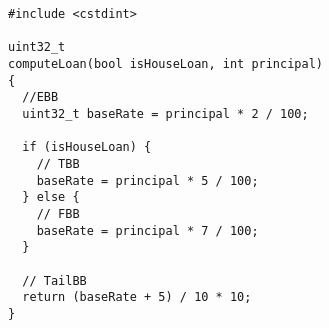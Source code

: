 \begin{minipage}{0.50\textwidth}
    \begin{lstlisting}[style=CStyle, basicstyle=\tiny\ttfamily]
#include <cstdint>

uint32_t 
computeLoan(bool isHouseLoan, int principal) 
{
  //EBB
  uint32_t baseRate = principal * 2 / 100;

  if (isHouseLoan) {
    // TBB
    baseRate = principal * 5 / 100;
  } else {
    // FBB
    baseRate = principal * 7 / 100;
  }

  // TailBB
  return (baseRate + 5) / 10 * 10;
}
    \end{lstlisting}
\end{minipage}%
\hspace{1cm} %
\begin{minipage}{0.40\textwidth}
\end{minipage}